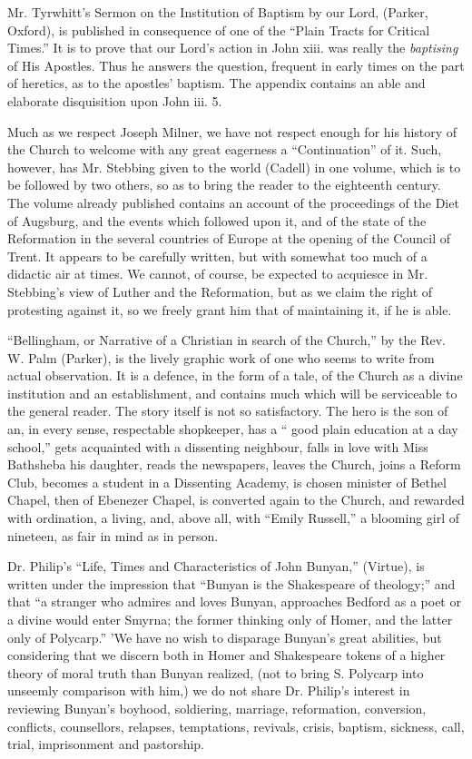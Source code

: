 Mr. Tyrwhitt's Sermon on the Institution of Baptism
by our Lord, (Parker, Oxford), is published in consequence of one of the
``Plain Tracts for Critical Times.'' It is to prove that our Lord's action
in John xiii. was really the \emph{baptising} of His Apostles. Thus he
answers the question, frequent in early times on the part of heretics,
as to the apostles' baptism. The appendix contains an able and elaborate
disquisition upon John iii. 5.

Much as we respect Joseph Milner, we have not
respect enough for his history of the Church to welcome with any great
eagerness a ``Continuation'' of it. Such, however, has Mr. Stebbing given
to the world (Cadell) in one volume, which is to be followed by two
others, so as to bring the reader to the eighteenth century. The volume
already published contains an account of the proceedings of the Diet of
Augsburg, and the events which followed upon it, and of the state of the
Reformation in the several countries of Europe at the opening of the
Council of Trent. It appears to be carefully written, but with somewhat
too much of a didactic air at times. We cannot, of course, be expected
to acquiesce in Mr. Stebbing's view of Luther and the Reformation, but
as we claim the right of protesting against it, so we freely grant him
that of maintaining it, if he is able.

``Bellingham, or Narrative of a Christian in search
of the Church,'' by the Rev. W. Palm (Parker), is the lively graphic work
of one who seems to write from actual observation. It is a defence, in
the form of a tale, of the Church as a divine institution and an
establishment, and contains much which will be serviceable to the
general reader. The story itself is not so satisfactory. The hero is the
son of an, in every sense, respectable shopkeeper, has a `` good plain
education at a day school,'' gets acquainted with a dissenting neighbour,
falls in love with Miss Bathsheba his daughter, reads the newspapers,
leaves the Church, joins a Reform Club, becomes a student in a
Dissenting Academy, is chosen minister of Bethel Chapel, then of
Ebenezer Chapel, is converted again to the Church, and rewarded with
ordination, a living, and, above all, with ``Emily Russell,'' a blooming
girl of nineteen, as fair in mind as in person.

Dr. Philip's ``Life, Times and Characteristics of
John Bunyan,'' (Virtue), is written under the impression that ``Bunyan is
the Shakespeare of theology;'' and that ``a stranger who admires and loves
Bunyan, approaches Bedford as a poet or a divine would enter Smyrna; the
former thinking only of Homer, and the latter only of Polycarp.'' 'We
have no wish to disparage Bunyan's great abilities, but considering that
we discern both in Homer and Shakespeare tokens of a higher theory of
moral truth than Bunyan realized, (not to bring S. Polycarp into
unseemly comparison with him,) we do not share Dr. Philip's interest in
reviewing Bunyan's boyhood, soldiering, marriage, reformation,
conversion, conflicts, counsellors, relapses, temptations, revivals,
crisis, baptism, sickness, call, trial, imprisonment and pastorship.


